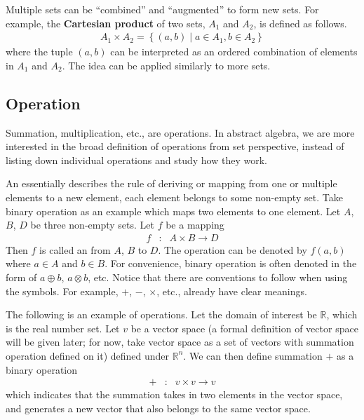 Multiple sets can be ``combined'' and ``augmented'' to form new sets. For example, the \textbf{Cartesian product} of two sets, $A_1$ and $A_2$, is defined as follows.
\begin{eqnarray}
	A_1 \times A_2 = \left\{(a,b) \middle| a \in A_1, b\in A_2\right\} \nonumber
\end{eqnarray}
where the tuple $(a,b)$ can be interpreted as an ordered combination of elements in $A_1$ and $A_2$. The idea can be applied similarly to more sets.

\subsection{Operation}

Summation, multiplication, etc., are operations. In abstract algebra, we are more interested in the broad definition of operations from set perspective, instead of listing down individual operations and study how they work.

An  essentially describes the rule of deriving or mapping from one or multiple elements to a new element, each element belongs to some non-empty set. Take binary operation as an example which maps two elements to one element. Let $A$, $B$, $D$ be three non-empty sets. Let $f$ be a mapping
\begin{eqnarray}
	f &:& A \times B \rightarrow D \label{eq:operation_general_def}
\end{eqnarray}
Then $f$ is called an  from $A$, $B$ to $D$. The operation can be denoted by $f(a,b)$ where $a\in A$ and $b\in B$. For convenience, binary operation is often denoted in the form of $a\oplus b$, $a\otimes b$, etc. Notice that there are conventions to follow when using the symbols. For example, $+$, $-$, $\times$, etc., already have clear meanings.

The following is an example of operations. Let the domain of interest be $\mathbb{R}$, which is the real number set. Let $v$ be a vector space (a formal definition of vector space will be given later; for now, take vector space as a set of vectors with summation operation defined on it) defined under $\mathbb{R}^n$. We can then define summation $+$ as a binary operation
\begin{eqnarray}
	+ &:& v\times v \rightarrow v \nonumber
\end{eqnarray} 
which indicates that the summation takes in two elements in the vector space, and generates a new vector that also belongs to the same vector space. 

